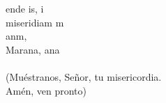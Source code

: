 \begin{cancion}%
	ende is, i\\
	miseridiam m\\
	anm,\\
	Marana, ana\\
	\jump\\
(Muéstranos, Señor, tu misericordia.\\
 Amén, ven pronto)\\
\end{cancion}%
